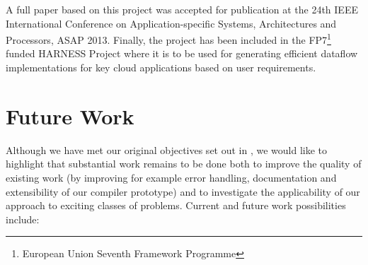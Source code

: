A full paper based on this project was accepted for publication at the
24th IEEE International Conference on Application-specific Systems,
Architectures and Processors, ASAP 2013. Finally, the project has been
included in the FP7\footnote{European Union Seventh Framework
  Programme} funded HARNESS Project where it is to be used for
generating efficient dataflow implementations for key cloud
applications based on user requirements.

\section{Future Work}

Although we have met our original objectives set out in
, we would like to highlight that
substantial work remains to be done both to improve the quality of
existing work (by improving for example error handling, documentation
and extensibility of our compiler prototype) and to investigate the
applicability of our approach to exciting classes of problems. Current
and future work possibilities include:

